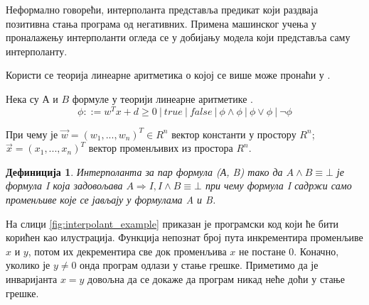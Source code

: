 \documentclass[a4paper]{article}
\newtheorem{definic}{Дефиниција}
\begin{document}
{Неформално говорећи, интерполанта представља предикат који раздваја позитивна стања програма
од негативних. Примена машинског учења у проналажењу интерполанти огледа се у добијању модела
који представља саму интерполанту.

Користи се теорија линеарне аритметика о којој се више може пронаћи у \cite{Kroening2008}.

Нека су $А$ и $B$ формуле у теорији линеарне аритметике \cite{Kroening2008}.
$$
    \phi ::= w^Tx + d \geq 0 \ | \ true \ | \ false \ | \ \phi \land \phi \ | \ \phi \lor \phi \ | \ \neg \phi
$$

При чему је $\vec{w} = (w_1, ..., w_n)^T \in R^n$ вектор константи у простору $R^n$; $\vec{x} = (x_1, ..., x_n)^T$
вектор променљивих из простора $R^n$.

\begin{definic}
Интерполанта за пар формула (А, B) тако да $A \land B \equiv \bot$ је формула I која задовољава $A \Rightarrow I, I \land B \equiv \bot$
при чему формула I садржи само променљиве које се јављају у формулама A и B.
\end{definic}

На слици \ref{fig:interpolant_example} приказан је програмски код који ће бити корићен као илустрација.
Функција непознат број пута инкрементира променљиве $x$ и $y$, потом их декрементира све док променљива $x$
не постане 0. Коначно, уколико је $y \neq 0$ онда програм одлази у стање грешке.
Приметимо да је инваријанта $x = y$ довољна да се докаже да програм никад неће доћи у стање грешке.

}
\end{document}
